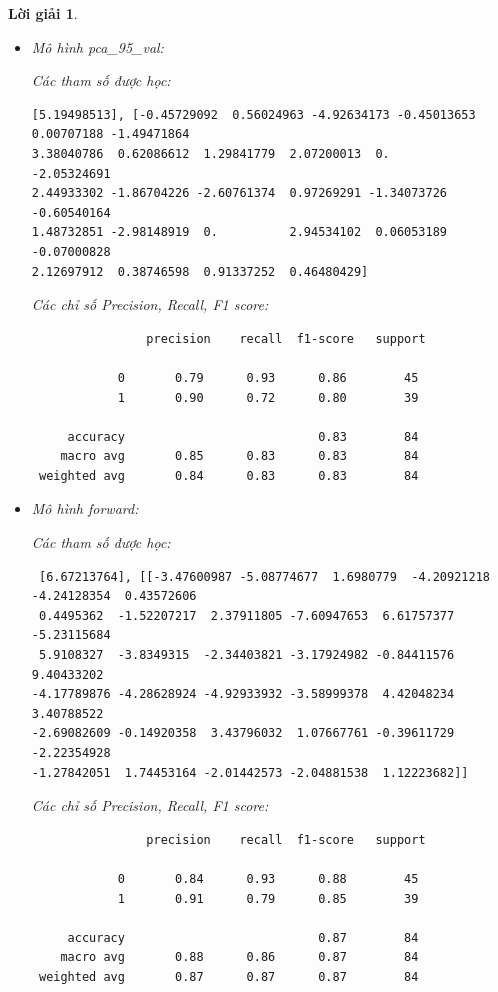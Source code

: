 \documentclass[14pt, a4paper]{article}
\theoremstyle{sltheorem}
\theoremstyle{soltheorem}
\newtheorem*{loigiai}{Lời giải}
\begin{document}
\begin{loigiai}
\begin{itemize}
        \item Mô hình pca\_95\_val:
        
        Các tham số được học:

        \begin{verbatim}
[5.19498513], [-0.45729092  0.56024963 -4.92634173 -0.45013653  0.00707188 -1.49471864
3.38040786  0.62086612  1.29841779  2.07200013  0.         -2.05324691
2.44933302 -1.86704226 -2.60761374  0.97269291 -1.34073726 -0.60540164
1.48732851 -2.98148919  0.          2.94534102  0.06053189 -0.07000828
2.12697912  0.38746598  0.91337252  0.46480429]
        \end{verbatim}

        Các chỉ số Precision, Recall, F1 score:

        \begin{verbatim}
                precision    recall  f1-score   support

            0       0.79      0.93      0.86        45
            1       0.90      0.72      0.80        39
 
     accuracy                           0.83        84
    macro avg       0.85      0.83      0.83        84
 weighted avg       0.84      0.83      0.83        84
        \end{verbatim}

        \item Mô hình forward:
        
        Các tham số được học:

        \begin{verbatim}
 [6.67213764], [[-3.47600987 -5.08774677  1.6980779  -4.20921218 -4.24128354  0.43572606
 0.4495362  -1.52207217  2.37911805 -7.60947653  6.61757377 -5.23115684
 5.9108327  -3.8349315  -2.34403821 -3.17924982 -0.84411576  9.40433202
-4.17789876 -4.28628924 -4.92933932 -3.58999378  4.42048234  3.40788522
-2.69082609 -0.14920358  3.43796032  1.07667761 -0.39611729 -2.22354928
-1.27842051  1.74453164 -2.01442573 -2.04881538  1.12223682]]
        \end{verbatim}

        Các chỉ số Precision, Recall, F1 score:
        
        \begin{verbatim}
                precision    recall  f1-score   support

            0       0.84      0.93      0.88        45
            1       0.91      0.79      0.85        39
 
     accuracy                           0.87        84
    macro avg       0.88      0.86      0.87        84
 weighted avg       0.87      0.87      0.87        84
        \end{verbatim}


\end{itemize}
\end{loigiai}
\end{document}
